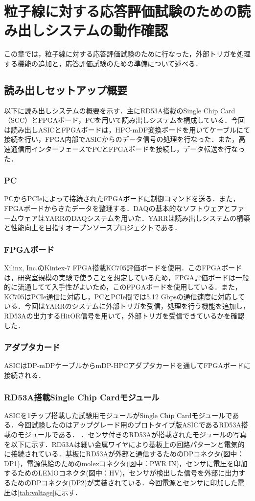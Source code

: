 \chapter{粒子線に対する応答評価試験のための読み出しシステムの動作確認}
この章では，粒子線に対する応答評価試験のために行なった，外部トリガを処理する機能の追加と，応答評価試験のための準備について述べる．

\section{読み出しセットアップ概要}
以下に読み出しシステムの概要を示す．主にRD53A搭載のSingle Chip Card（SCC）とFPGAボード，PCを用いて読み出しシステムを構成している．今回は読み出しASICとFPGAボードは，HPC-mDP変換ボードを用いてケーブルにて接続を行い，FPGA内部でASICからのデータ信号の処理を行なった．また，高速通信用インターフェースでPCとFPGAボードを接続し，データ転送を行なった．\\

\subsection*{PC}
PCからPCIeによって接続されたFPGAボードに制御コマンドを送る．また，FPGAボードからきたデータを整理する．DAQの基本的なソフトウェアとファームウェアはYARRのDAQシステムを用いた．YARRは読み出しシステムの構築と性能向上を目指すオープンソースプロジェクトである．

\subsection*{FPGAボード}
Xilinx, Inc.のKintex-7 FPGA搭載KC705評価ボードを使用．このFPGAボードは，研究室規模の実験で使うことを想定しているため，FPGA評価ボードは一般的に流通してて入手性がよいため，このFPGAボードを使用している．また，KC705はPCIe通信に対応し，PCとPCIe間では5.12 $\mathrm{Gbps}$の通信速度に対応している．今回はYARRのシステムに外部トリガを受信，処理を行う機能を追加し，RD53Aの出力するHitOR信号を用いて，外部トリガを受信できているかを確認した．

\subsection*{アダプタカード}
ASICはDP-mDPケーブルからmDP-HPCアダプタカードを通してFPGAボードに接続される．

\subsection*{RD53A搭載Single Chip Cardモジュール}
ASICを1チップ搭載した試験用モジュールがSingle Chip Cardモジュールである．今回試験したのはアップグレード用のプロトタイプ版ASICであるRD53A搭載のモジュールである．
．センサ付きのRD53Aが搭載されたモジュールの写真を以下に示す．RD53Aは細い金属ワイヤにより基板上の回路パターンと電気的に接続されている．基板にRD53Aが外部と通信するためのDPコネクタ(図中：DP1)，電源供給のためのmolexコネクタ(図中：PWR IN)，センサに電圧を印加するためのLEMOコネクタ(図中：HV)，センサが検出した信号を外部に出力するためのDPコネクタ(DP2)が実装されている．今回電源とセンサに印加した電圧は\ref{tab:voltage}に示す．

